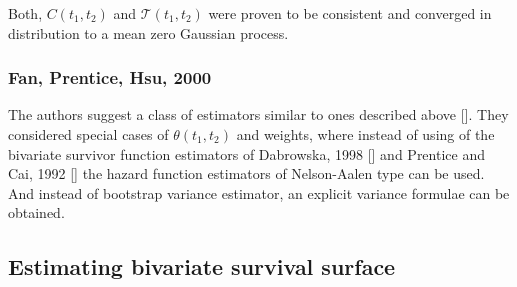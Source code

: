 \documentclass[]{article}
\begin{document}
Both, $C(t_1, t_2)$ and $\mathcal{T}(t_1, t_2)$ were proven to be consistent and converged in distribution to a mean zero Gaussian process.

\subsubsection{Fan, Prentice, Hsu, 2000 \cite{fan2000class}}
The authors suggest a class of estimators similar to ones described above [\cite{fan2000dependence}]. They considered special cases of $\theta(t_1, t_2)$ and weights, where instead of using of the bivariate survivor function estimators of Dabrowska, 1998 [\cite{dabrowska1988kaplan}] and Prentice and Cai, 1992 [\cite{prentice1992covariance}] the hazard function estimators of Nelson-Aalen type can be used. And instead of bootstrap variance estimator, an explicit variance formulae can be obtained.\\


\subsection{Estimating bivariate survival surface}
\end{document}
